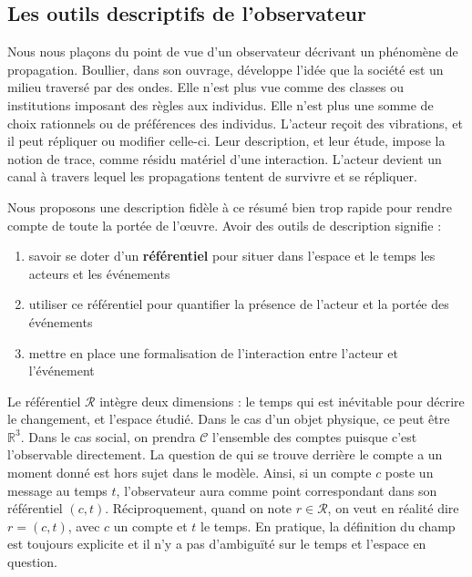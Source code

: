 \documentclass[11pt]{article}
\begin{document}
		
		\subsection{Les outils descriptifs de l'observateur}	
		
			Nous nous plaçons du point de vue d'un observateur décrivant un phénomène de propagation. Boullier, dans son ouvrage, développe l'idée que la société est un milieu traversé par des ondes. Elle n'est plus vue comme des classes ou institutions imposant des règles aux individus. Elle n'est plus une somme de choix rationnels ou de préférences des individus. L'acteur reçoit des vibrations, et il peut répliquer ou modifier celle-ci. Leur description, et leur étude, impose la notion de trace, comme résidu matériel d'une interaction. L'acteur devient un canal à travers lequel les propagations tentent de survivre et se répliquer. 
			
			Nous proposons une description fidèle à ce résumé bien trop rapide pour rendre compte de toute la portée de l'œuvre. Avoir des outils de description signifie : 
			\begin{enumerate}
				\item savoir se doter d'un \textbf{référentiel} pour situer dans l'espace et le temps les acteurs et les événements
				\item utiliser ce référentiel pour quantifier la présence de l'acteur et la portée des événements
				\item mettre en place une formalisation de l'interaction entre l'acteur et l'événement
			\end{enumerate}
			
			Le référentiel $\mathcal{R}$ intègre deux dimensions : le temps qui est inévitable pour décrire le changement, et l'espace étudié. Dans le cas d'un objet physique, ce peut être $\mathbb{R}^3$. Dans le cas social, on prendra $\mathcal{C}$ l'ensemble des comptes puisque c'est l'observable directement. La question de qui se trouve derrière le compte a un moment donné est hors sujet dans le modèle. Ainsi, si un compte $c$ poste un message au temps $t$, l'observateur aura comme point correspondant dans son référentiel $(c,t)$. Réciproquement, quand on note $r \in \mathcal{R}$, on veut en réalité dire $r = (c,t)$, avec $c$ un compte et $t$ le temps. En pratique, la définition du champ est toujours explicite et il n'y a pas d'ambiguïté sur le temps et l'espace en question. 
			
\end{document}
